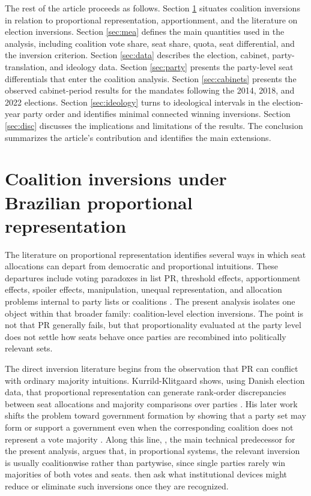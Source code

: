 \documentclass[11pt]{article}
\begin{document}
The rest of the article proceeds as follows. Section \ref{sec:theory}
situates coalition inversions in relation to proportional representation,
apportionment, and the literature on election inversions. Section
\ref{sec:mea} defines the main quantities used in the analysis, including
coalition vote share, seat share, quota, seat differential, and the inversion
criterion. Section \ref{sec:data} describes the election, cabinet,
party-translation, and ideology data. Section \ref{sec:party} presents the
party-level seat differentials that enter the coalition analysis. Section
\ref{sec:cabinets} presents the observed cabinet-period results for the
mandates following the 2014, 2018, and 2022 elections. Section \ref{sec:ideology} turns to ideological intervals in the election-year
party order and identifies minimal connected winning inversions. Section \ref{sec:disc}
discusses the implications and limitations of the results. The conclusion
summarizes the article's contribution and identifies the main extensions.




\section{Coalition inversions under Brazilian proportional representation}
\label{sec:theory}
The literature on proportional representation identifies several ways in which seat allocations can depart from democratic and proportional intuitions. These departures include voting paradoxes in list PR, threshold effects, apportionment effects, spoiler effects, manipulation, unequal representation, and allocation problems internal to party lists or coalitions \parencite{nurmi1999voting,Saari_2001,van1993paradoxes,balinski2010fair,kaminski2002parties,kaminski18_spoil_effec_propor_repres_system,flis2019pot_ladle,wada24_unified_approac_to_measur_unequal_repres}. The present analysis isolates one object within that broader family: coalition-level election inversions. The point is not that PR generally fails, but that proportionality evaluated at the party level does not settle how seats behave once parties are recombined into politically relevant sets.

The direct inversion literature begins from the observation that PR can conflict with ordinary majority intuitions. Kurrild-Klitgaard shows, using Danish election data, that proportional representation can generate rank-order discrepancies between seat allocations and majority comparisons over parties \parencite{kurrild2008voting}. His later work shifts the problem toward government formation by showing that a party set may form or support a government even when the corresponding coalition does not represent a vote majority \parencite{kurrild-klitgaard13_elect_inver_coalit_propor_repres}. Along this line, \textcite{miller14_elect_inver_under_propor_repres}, the main technical predecessor for the present analysis, argues that, in proportional systems, the relevant inversion is usually coalitionwise rather than partywise, since single parties rarely win majorities of both votes and seats. \textcite{felsenthal15_what_to_do_about_elect} then ask what institutional devices might reduce or eliminate such inversions once they are recognized.
\end{document}
